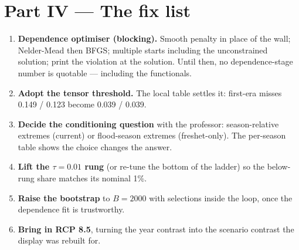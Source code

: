 \documentclass[11pt]{article}
\begin{document}
\section*{Part IV --- The fix list}

\begin{enumerate}
\item \textbf{Dependence optimiser (blocking).} Smooth penalty in place of
the wall; Nelder-Mead then BFGS; multiple starts including the unconstrained
solution; print the violation at the solution. Until then, no
dependence-stage number is quotable --- including the functionals.
\item \textbf{Adopt the tensor threshold.} The local table settles it:
first-era misses 0.149 / 0.123 become 0.039 / 0.039.
\item \textbf{Decide the conditioning question} with the professor:
season-relative extremes (current) or flood-season extremes (freshet-only).
The per-season table shows the choice changes the answer.
\item \textbf{Lift the $\tau = 0.01$ rung} (or re-tune the bottom of the
ladder) so the below-rung share matches its nominal 1\%.
\item \textbf{Raise the bootstrap} to $B = 2000$ with selections inside the
loop, once the dependence fit is trustworthy.
\item \textbf{Bring in RCP 8.5}, turning the year contrast into the scenario
contrast the display was rebuilt for.
\end{enumerate}
\end{document}
